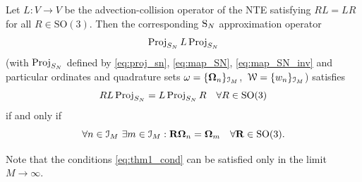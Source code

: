 \label{sec:SI}



 
\begin{theorem*}\label{thm:commut_NTE}
Let $L : V\to V$ be the advection-collision operator of the NTE satisfying
$RL = LR$ for all $R\in\mathrm{SO}(3)$. 
Then the corresponding $\SN$ approximation operator
\begin{equation}\label{eq:sn_op_app}
	\Projop[S_N]\op{L}\Projop[S_N]
\end{equation}
(with $\Projop[S_N]$ defined by \eqref{eq:proj_sn}, \eqref{eq:map_SN}, \eqref{eq:map_SN_inv} and particular
ordinates and quadrature sets \mbox{$\omega = \{\bomega_n\}_{\idxset{M}}$, $\mathcal{W} = \{w_n\}_{\idxset{M}}$})
satisfies $$
\op{R}\op{L}\Projop[S_N] = \op{L}\Projop[S_N]\op{R}\quad \forall R\in\mathrm{SO}(3)
$$
if and only if
\begin{equation}\label{eq:thm1_cond}
	\forall n\in \idxset{M}\ \exists m\in\idxset{M}: \mat{R}\bomega_n = \bomega_m \quad \forall \mat{R}\in\mathrm{SO}(3).
\end{equation} 
\end{theorem*}
\begin{remark*}
	Note that the conditions \eqref{eq:thm1_cond} can be satisfied only in the limit \mbox{$M\to\infty$}.
\end{remark*}
